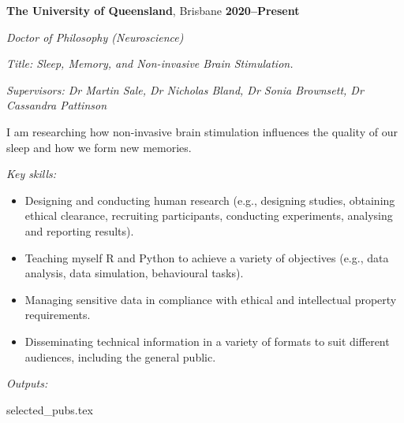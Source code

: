\textbf{\large The University of Queensland}, {\large Brisbane} \hfill \textbf{2020--Present} \par
\textit{Doctor of Philosophy (Neuroscience)} \par
\textit{Title: Sleep, Memory, and Non-invasive Brain Stimulation.}\par
\textit{Supervisors: Dr Martin Sale, Dr Nicholas Bland, Dr Sonia Brownsett, Dr Cassandra Pattinson}\par
I am researching how non-invasive brain stimulation influences the quality of our sleep and how we form new memories.\par
\vspace{1mm}
\textit{Key skills:} \par
\begin{itemize}
	\item Designing and conducting human research (e.g., designing studies, obtaining ethical clearance, recruiting participants, conducting experiments, analysing and reporting results).
	\item Teaching myself R and Python to achieve a variety of objectives (e.g., data analysis, data simulation, behavioural tasks).
	\item Managing sensitive data in compliance with ethical and intellectual property requirements.
	\item Disseminating technical information in a variety of formats to suit different audiences, including the general public.
\end{itemize}\par
\vspace{1mm}
\textit{Outputs:}
\begin{enumerate}
	{selected_pubs.tex}
\end{enumerate}\par